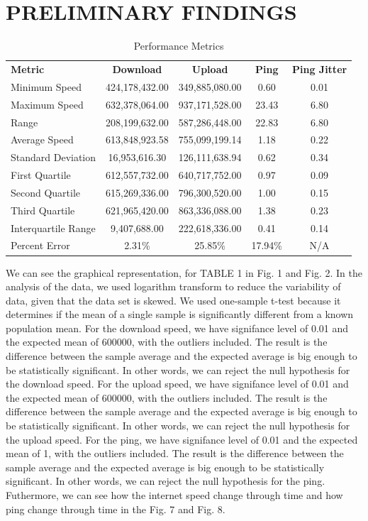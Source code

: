 \documentclass[conference]{IEEEtran}
\begin{document}
\section{PRELIMINARY FINDINGS}
\begin{table}[htbp]
    \centering
    \caption{Performance Metrics}
    \begin{tabular}{lcccc}
        \textbf{Metric} & \textbf{Download} & \textbf{Upload} & \textbf{Ping} & \textbf{Ping Jitter} \\
        Minimum Speed & 424,178,432.00 & 349,885,080.00 & 0.60 & 0.01 \\
        Maximum Speed & 632,378,064.00 & 937,171,528.00 & 23.43 & 6.80 \\
        Range & 208,199,632.00 & 587,286,448.00 & 22.83 & 6.80 \\
        Average Speed & 613,848,923.58 & 755,099,199.14 & 1.18 & 0.22 \\
        Standard Deviation & 16,953,616.30 & 126,111,638.94 & 0.62 & 0.34 \\
        First Quartile & 612,557,732.00 & 640,717,752.00 & 0.97 & 0.09 \\
        Second Quartile & 615,269,336.00 & 796,300,520.00 & 1.00 & 0.15 \\
        Third Quartile & 621,965,420.00 & 863,336,088.00 & 1.38 & 0.23 \\
        Interquartile Range & 9,407,688.00 & 222,618,336.00 & 0.41 & 0.14 \\
        Percent Error & 2.31\% & 25.85\% & 17.94\% & N/A \\
    \end{tabular}
    \label{tab:performance}
\end{table}
We can see the graphical representation, for TABLE 1 in Fig. 1 and Fig. 2.
In the analysis of the data, we used logarithm transform to reduce the variability of data, given that the data set is skewed.
We used one-sample t-test because it determines if the mean of a single sample is significantly different from a known population mean.
For the download speed, we have signifance level of 0.01 and the expected mean of 600000, with the outliers included. 
The result is the difference between the sample average and the expected average is big enough to be statistically significant. 
In other words, we can reject the null hypothesis for the download speed.
For the upload speed, we have signifance level of 0.01 and the expected mean of 600000, with the outliers included. 
The result is the difference between the sample average and the expected average is big enough to be statistically significant. 
In other words, we can reject the null hypothesis for the upload speed.
For the ping, we have signifance level of 0.01 and the expected mean of 1, with the outliers included. 
The result is the difference between the sample average and the expected average is big enough to be statistically significant. 
In other words, we can reject the null hypothesis for the ping.
Futhermore, we can see how the internet speed change through time and how ping change through time in the Fig. 7 and Fig. 8.
\end{document}
